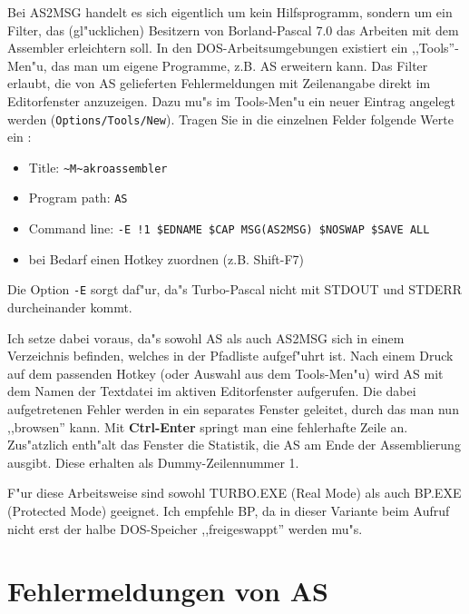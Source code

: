 \documentclass[12pt,a4paper,twoside]{report}
\newcommand{\bb}[1]{{\bf #1}}
\newcommand{\tty}[1]{{\tt #1}}
\newcommand{\asname}{AS}
\begin{document}
Bei AS2MSG handelt es sich eigentlich um kein Hilfsprogramm, sondern um ein
Filter, das (gl"ucklichen) Besitzern von Borland-Pascal 7.0 das Arbeiten
mit dem Assembler erleichtern soll.  In den DOS-Arbeitsumgebungen existiert
ein ,,Tools''-Men"u, das man um eigene Programme, z.B. \asname{} erweitern kann.
Das Filter erlaubt, die von \asname{} gelieferten Fehlermeldungen mit Zeilenangabe
direkt im Editorfenster anzuzeigen.  Dazu mu"s im Tools-Men"u ein neuer
Eintrag angelegt werden (\tty{Options/Tools/New}).  Tragen Sie in die
einzelnen Felder folgende Werte ein :
\begin{itemize}
\item{Title: {\tt \verb!~!M\verb!~!akroassembler}}
\item{Program path: \tty{\asname{}}}
\item{Command line: \tty{-E !1 \$EDNAME \$CAP MSG(AS2MSG) \$NOSWAP \$SAVE
ALL}}
\item{bei Bedarf einen Hotkey zuordnen (z.B. Shift-F7)}
\end{itemize}
Die Option \tty{-E} sorgt daf"ur, da"s Turbo-Pascal nicht mit STDOUT und
STDERR durcheinander kommt.
\par
Ich setze dabei voraus, da"s sowohl \asname{} als auch AS2MSG sich in einem
Verzeichnis befinden, welches in der Pfadliste aufgef"uhrt ist.  Nach einem
Druck auf dem passenden Hotkey (oder Auswahl aus dem Tools-Men"u) wird \asname{} mit
dem Namen der Textdatei im aktiven Editorfenster aufgerufen.  Die dabei
aufgetretenen Fehler werden in ein separates Fenster geleitet, durch das man
nun ,,browsen'' kann.  Mit \bb{Ctrl-Enter} springt man eine fehlerhafte
Zeile an.  Zus"atzlich enth"alt das Fenster die Statistik, die \asname{} am Ende
der Assemblierung ausgibt.  Diese erhalten als Dummy-Zeilennummer 1.
\par
F"ur diese Arbeitsweise sind sowohl TURBO.EXE (Real Mode) als auch BP.EXE
(Protected Mode) geeignet.  Ich empfehle BP, da in dieser Variante beim
Aufruf nicht erst der halbe DOS-Speicher ,,freigeswappt'' werden mu"s.

\cleardoublepage

\appendix


\cleardoublepage
\chapter{Fehlermeldungen von \asname{}}
\label{ChapErrMess}
\end{document}
